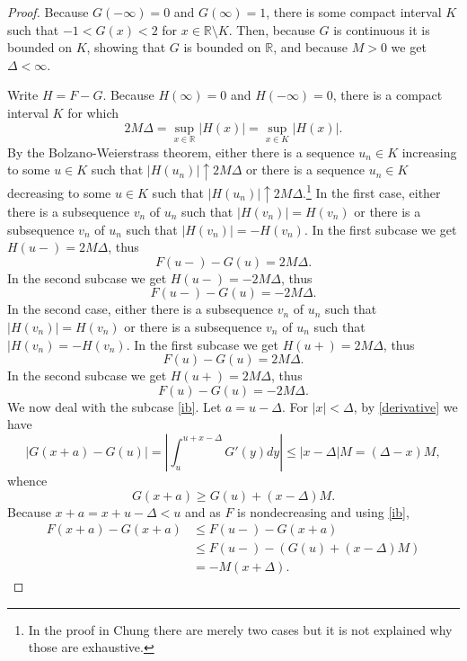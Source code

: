 \documentclass{article}
\theoremstyle{definition}
\theoremstyle{definition}
\begin{document}
\begin{proof}
Because $G(-\infty)=0$ and $G(\infty)=1$, there is some compact interval $K$ such that
$-1<G(x)<2$ for $x \in \mathbb{R} \setminus K$. Then, because $G$ is continuous it is bounded on
$K$, showing that $G$ is bounded on $\mathbb{R}$, and because $M>0$ we get
 $\Delta<\infty$. 

Write $H=F-G$.
Because $H(\infty)=0$ and $H(-\infty)=0$, there is a compact interval $K$ for which
\[
2M\Delta = \sup_{x \in \mathbb{R}} |H(x)| = \sup_{x \in K} |H(x)|.
\]
By the Bolzano-Weierstrass theorem, either there
  is a sequence $u_n \in K$ increasing to some $u \in K$ such that
  $|H(u_n)| \uparrow 2M\Delta$
  or there is a sequence $u_n \in K$ decreasing to some $u \in K$ such that
  $|H(u_n)| \uparrow 2M\Delta$.\footnote{In the proof in Chung there are merely two cases but it is not explained why those
  are exhaustive.} In the first case, either there is a subsequence $v_n$ of $u_n$ such that
  $|H(v_n)|=H(v_n)$ or there is a subsequence $v_n$ of $u_n$ such that $|H(v_n)|=-H(v_n)$. 
  In the first subcase we get
  $H(u-)=2M\Delta$, thus
  \begin{equation}
F(u-)-G(u)=2M\Delta.
\label{ia}  
  \end{equation}
In the second subcase we get 
$H(u-)=-2M\Delta$, thus
\begin{equation}
F(u-)-G(u)=-2M\Delta.
\label{ib}
\end{equation}
In the second case, either there is a subsequence $v_n$ of $u_n$ such that
$|H(v_n)|=H(v_n)$ or there is a subsequence $v_n$ of $u_n$ such that $|H(v_n)=-H(v_n)$.
In the first subcase we get
$H(u+)=2M\Delta$, thus
\begin{equation}
F(u)-G(u)=2M\Delta.
\label{iia}
\end{equation}
In the second subcase we get $H(u+)=2M\Delta$, thus
\begin{equation}
F(u)-G(u)=-2M\Delta.
\label{iib}
\end{equation}
We now deal with the subcase \eqref{ib}. Let
$a=u-\Delta$. For $|x|<\Delta$, 
by \eqref{derivative} we have
\[
|G(x+a)-G(u)| = \left| \int_u^{u+x-\Delta} G'(y) dy\right| \leq 
|x-\Delta| M = (\Delta-x)M,
\]
whence
\[
G(x+a) \geq G(u)  + (x-\Delta)M.
\]
Because $x+a = x+u-\Delta < u$ and as $F$ is nondecreasing and using \eqref{ib},
\begin{align*}
F(x+a)-G(x+a)& \leq F(u-)-G(x+a)\\
&\leq F(u-) - (G(u)+(x-\Delta)M)\\
&=-M(x+\Delta).
\end{align*}

\end{proof}
\end{document}
